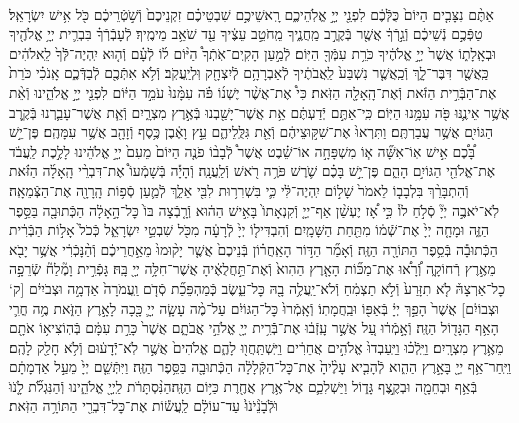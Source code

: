 \documentclass[twoside, openany, parskip=half, 11pt]{book}
\begin{document}
\begin{footnotesize}
\begin{multicols}{2}
\\
אַתֶּ֨ם נִצָּבִ֤ים הַיּוֹם֙ כֻּלְּֿכֶ֔ם לִפְנֵ֖י יְיָ֣ אֱלֹֽהֵיכֶ֑ם רָֽאשֵׁיכֶ֣ם שִׁבְטֵיכֶ֗ם זִקְנֵיכֶם֙ וְֿשֹׁ֣טְֿרֵיכֶ֔ם כֹּ֖ל אִ֥ישׁ יִשְׂרָאֵֽל׃ טַפְּֿכֶ֣ם נְֿשֵׁיכֶ֔ם וְֿגֵ֣רְֿךָ֔ אֲשֶׁ֖ר בְּֿקֶרֶ֣ב מַֽחֲנֶ֑יךָ מֵֽחֹטֵ֣ב עֵצֶ֔יךָ עַ֖ד שֹׁאֵ֥ב מֵימֶֽיךָ׃ לְֿעָבְֿרְֿךָ֗ בִּבְרִ֛ית יְיָ֥ אֱלֹהֶ֖יךָ וּבְאָֽלָת֑וֹ אֲשֶׁר֙ יְיָ֣ אֱלֹהֶ֔יךָ כֹּרֵ֥ת עִמְּֿךָ֖ הַיּֽוֹם׃
לְֿמַ֣עַן הָקִֽים־אֹֽתְֿךָ֩ הַיּ֨וֹם ל֜וֹ לְֿעָ֗ם וְֿה֤וּא יִֽהְיֶה־לְּֿֿךָ֙ לֵֽאלֹהִ֔ים כַּֽאֲשֶׁ֖ר דִּבֶּר־לָ֑ךְ וְֿכַֽאֲשֶׁ֤ר נִשְׁבַּע֙ לַֽאֲבֹתֶ֔יךָ לְֿאַבְרָהָ֥ם לְֿיִצְחָ֖ק וּֽלְיַֽעֲקֹֽב׃ וְֿלֹ֥א אִתְּֿכֶ֖ם לְֿבַדְּֿכֶ֑ם אָֽנֹכִ֗י כֹּרֵת֙ אֶת־הַבְּֿרִ֣ית הַזֹּ֔את וְֿאֶת־הָֽאָלָ֖ה הַזֹּֽאת׃ כִּי֩ אֶת־אֲשֶׁ֨ר יֶשְׁנ֜וֹ פֹּ֗ה עִמָּ֨נוּ֙ עֹמֵ֣ד הַיּ֔וֹם לִפְנֵ֖י יְיָ֣ אֱלֹהֵ֑ינוּ וְֿאֵ֨ת אֲשֶׁ֥ר אֵינֶ֛נּוּ פֹּ֖ה עִמָּ֥נוּ הַיּֽוֹם׃
כִּֽי־אַתֶּ֣ם יְֿדַעְתֶּ֔ם אֵ֥ת אֲשֶׁר־יָשַׁ֖בְנוּ בְּֿאֶ֣רֶץ מִצְרָ֑יִם וְֿאֵ֧ת אֲשֶׁר־עָבַ֛רְנוּ בְּֿקֶ֥רֶב הַגּוֹיִ֖ם אֲשֶׁ֥ר עֲבַרְתֶּֽם׃ וַתִּרְאוּ֙ אֶת־שִׁקּ֣וּצֵיהֶ֔ם וְֿאֵ֖ת גִּלֻּֽלֵיהֶ֑ם עֵ֣ץ וָאֶ֔בֶן כֶּ֥סֶף וְֿזָהָ֖ב אֲשֶׁ֥ר עִמָּהֶֽם׃ פֶּן־יֵ֣שׁ בָּ֠כֶ֠ם אִ֣ישׁ אֽוֹ־אִשָּׁ֞ה א֧וֹ מִשְׁפָּחָ֣ה אוֹ־שֵׁ֗בֶט אֲשֶׁר֩ לְֿבָב֨וֹ פֹנֶ֤ה הַיּוֹם֙ מֵעִם֙ יְיָ֣ אֱלֹהֵ֔ינוּ לָלֶ֣כֶת לַֽעֲבֹ֔ד אֶת־אֱלֹהֵ֖י הַגּוֹיִ֣ם הָהֵ֑ם פֶּן־יֵ֣שׁ בָּכֶ֗ם שֹׁ֛רֶשׁ פֹּרֶ֥ה רֹ֖אשׁ וְֿלַֽעֲנָֽה׃ וְֿהָיָ֡ה בְּֿשָׁמְֿעוֹ֩ אֶת־דִּבְרֵ֨י הָֽאָלָ֜ה הַזֹּ֗את וְֿהִתְבָּרֵ֨ךְ בִּלְבָב֤וֹ לֵאמֹר֙ שָׁל֣וֹם יִֽהְיֶה־לִּ֔י כִּ֛י בִּשְׁרִר֥וּת לִבִּ֖י אֵלֵ֑ךְ לְֿמַ֛עַן סְֿפ֥וֹת הָֽרָוָ֖ה אֶת־הַצְּֿמֵאָֽה׃ לֹֽא־יֹאבֶ֣ה יְיָ֘ סְֿלֹ֣חַ לוֹ֒ כִּ֣י אָ֠ז יֶעְשַׁ֨ן אַף־יְיָ֤ וְֿקִנְאָתוֹ֙ בָּאִ֣ישׁ הַה֔וּא וְֿרָ֤בְֿצָה בּוֹ֙ כׇּל־הָ֣אָלָ֔ה הַכְּֿתוּבָ֖ה בַּסֵּ֣פֶר הַזֶּ֑ה וּמָחָ֤ה יְיָ֙ אֶת־שְֿׁמ֔וֹ מִתַּ֖חַת הַשָּׁמָֽיִם׃ וְֿהִבְדִּיל֤וֹ יְיָ֙ לְֿרָעָ֔ה מִכֹּ֖ל שִׁבְטֵ֣י יִשְׂרָאֵ֑ל כְּֿכֹל֙ אָל֣וֹת הַבְּֿרִ֔ית הַכְּֿתוּבָ֕ה בְּֿסֵ֥פֶר הַתּוֹרָ֖ה הַזֶּֽה׃ וְֿאָמַ֞ר הַדּ֣וֹר הָאַֽחֲר֗וֹן בְּֿנֵיכֶם֙ אֲשֶׁ֤ר יָק֨וּמוּ֙ מֵאַ֣חֲרֵיכֶ֔ם וְֿהַ֨נָּכְֿרִ֔י אֲשֶׁ֥ר יָבֹ֖א מֵאֶ֣רֶץ רְֿחוֹקָ֑ה וְֿ֠רָא֠וּ אֶת־מַכּ֞וֹת הָאָ֤רֶץ הַהִוא֙ וְֿאֶת־תַּ֣חֲלֻאֶ֔יהָ אֲשֶׁר־חִלָּ֥ה יְיָ֖ בָּֽהּ׃ גָּפְֿרִ֣ית וָמֶ֘לַח֘ שְֿׂרֵפָ֣ה כׇל־אַרְצָהּ֒ לֹ֤א תִזָּרַע֙ וְֿלֹ֣א תַצְמִ֔חַ וְֿלֹא־יַֽעֲלֶ֥ה בָ֖הּ כׇּל־עֵ֑שֶׂב כְּֽֿמַהְפֵּכַ֞ת סְֿדֹ֤ם וַֽעֲמֹרָה֙ אַדְמָ֣ה וּצְבֹיִי֔ם [ק‘ וּצְבוֹיִ֔ם] אֲשֶׁר֙ הָפַ֣ךְ יְיָ֔ בְּֿאַפּ֖וֹ וּבַֽחֲמָתֽוֹ׃ וְֿאָֽמְֿרוּ֙ כׇּל־הַגּוֹיִ֔ם עַל־מֶ֨ה עָשָׂ֧ה יְיָ֛ כָּ֖כָה לָאָ֣רֶץ הַזֹּ֑את מֶ֥ה חֳרִ֛י הָאַ֥ף הַגָּד֖וֹל הַזֶּֽה׃ וְֿאָ֣מְֿר֔וּ עַ֚ל אֲשֶׁ֣ר עָֽזְֿב֔וּ אֶת־בְּֿֿרִ֥ית יְיָ֖ אֱלֹהֵ֣י אֲבֹתָ֑ם אֲשֶׁר֙ כָּרַ֣ת עִמָּ֔ם בְּֿהֽוֹצִיא֥וֹ אֹתָ֖ם מֵאֶ֥רֶץ מִצְרָֽיִם׃ וַיֵּֽלְֿכ֗וּ וַיַּֽעַבְדוּ֙ אֱלֹהִ֣ים אֲחֵרִ֔ים וַיִּֽשְׁתַּֽחֲו֖וּ לָהֶ֑ם אֱלֹהִים֙ אֲשֶׁ֣ר לֹֽא־יְֿֿדָע֔וּם וְֿלֹ֥א חָלַ֖ק לָהֶֽם׃ וַיִּֽחַר־אַ֥ף יְיָ֖ בָּאָ֣רֶץ הַהִ֑וא לְֿהָבִ֤יא עָלֶ֨יהָ֙ אֶת־כׇּל־הַקְּֿלָלָ֔ה הַכְּֿתוּבָ֖ה בַּסֵּ֥פֶר הַזֶּֽה׃ וַיִּתְּֿשֵׁ֤ם יְיָ֙ מֵעַ֣ל אַדְמָתָ֔ם בְּֿאַ֥ף וּבְחֵמָ֖ה וּבְקֶ֣צֶף גָּד֑וֹל וַיַּשְׁלִכֵ֛ם אֶל־אֶ֥רֶץ אֲחֶ֖רֶת כַּיּ֥וֹם הַזֶּֽה׃הַנִּ֨סְתָּרֹ֔ת לַֽיְיָ֖ אֱלֹהֵ֑ינוּ וְֿהַנִּגְלֹ֞ת לָֹ֤נֹוֹּ וֹּלְֹֿבָֹנֵֹ֨יֹנֹוֹּ֙ עַד־עוֹלָ֔ם לַֽעֲשׂ֕וֹת אֶת־כׇּל־דִּבְרֵ֖י הַתּוֹרָ֥ה הַזֹּֽאת׃


\end{multicols}
\end{footnotesize}
\end{document}
